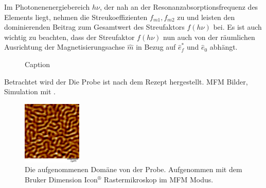 \noindent
Im Photonenenergiebereich $h\nu$, der nah an der Resonanzabsorptionsfrequenz des Elements liegt, nehmen die Streukoeffizienten $f_{m1}, f_{m2}$ zu und leisten den dominierenden Beitrag zum Gesamtwert des Streufaktors $f(h\nu)$ bei. Es ist auch wichtig zu beachten, dass der Streufaktor $f(h\nu)$ nun auch von der räumlichen Ausrichtung der Magnetisierungsachse $\hat{m}$ in Bezug auf $\hat{e}_f^*$ und $\hat{e}_0$ abhängt.
\begin{figure}
    \centering
    
    \caption{Caption}
    \label{fig:my_label}
\end{figure}
\noindent
Betrachtet wird der 
Die Probe ist nach dem Rezept \cite{tripathi_dichroic_2011} hergestellt. MFM Bilder, Simulation mit \cite{schick_udkm1dsim_2021}.
\begin{figure}[h]
    \centering
    \includegraphics[width=0.25\textwidth]{images/ds220126_R1_membrane_amplitude_cropped.png}
    \caption{Die aufgenommenen Domäne von der Probe. Aufgenommen mit dem Bruker Dimension Icon$^{\text{®}}$ Rastermikroskop im MFM Modus.}
    \label{fig:mfm_amplitude}
\end{figure}

\newpage